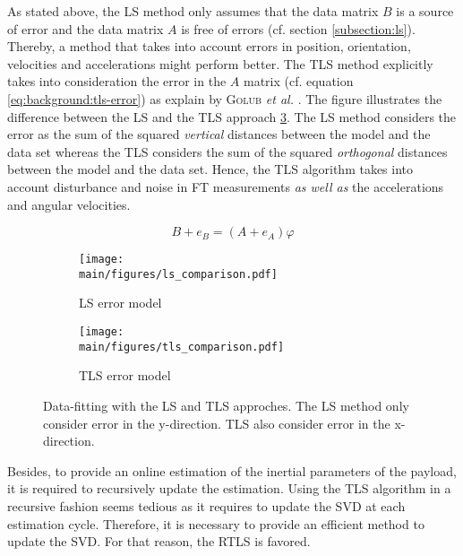 \documentclass[/home/francois/latex/report/main.tex]{subfiles}
\begin{document}
As stated above, the \ac{LS} method only assumes that the data matrix $B$ is a source of error and the data matrix $A$ is free of errors (cf. section \ref{subsection:ls}). Thereby, a method that takes into account errors in position, orientation, velocities and accelerations might perform better. The \ac{TLS} method explicitly takes into consideration the error in the $A$ matrix (cf. equation \ref{eq:background:tls-error}) as explain by \textsc{Golub} \textit{et al.} \cite{Golub1980}. The figure illustrates the difference between the \ac{LS} and the \ac{TLS} approach \ref{fig:background:ls-tls-error}. The \ac{LS} method considers the error as the sum of the squared \textit{vertical} distances between the model and the data set whereas the \ac{TLS} considers the sum of the squared \textit{orthogonal} distances between the model and the data set. Hence, the \ac{TLS} algorithm takes into account disturbance and noise in \ac{FT} measurements \textit{as well as} the accelerations and angular velocities.

\begin{equation}
  \label{eq:background:tls-error}
B + e_B = (A + e_A) \varphi
\end{equation}

\begin{figure}[h]
\centering
\begin{subfigure}{0.49\textwidth}
\centering
\texttt{[image: \\main/figures/ls\_comparison.pdf]}
\caption{\ac{LS} error model}
\label{fig:background:ls-error}
\end{subfigure}
\begin{subfigure}{0.49\textwidth}
\centering
\texttt{[image: \\main/figures/tls\_comparison.pdf]}
\caption{\ac{TLS} error model}
\label{fig:background:tls-error}
\end{subfigure}
\caption{Data-fitting with the \ac{LS} and \ac{TLS} approches. The \ac{LS} method only consider error in the y-direction. \ac{TLS} also consider error in the x-direction.}
\label{fig:background:ls-tls-error}
\end{figure}

Besides, to provide an online estimation of the inertial parameters of the payload, it is required to recursively update the estimation. Using the \ac{TLS} algorithm in a recursive fashion seems tedious as it requires to update the \ac{SVD} at each estimation cycle. Therefore, it is necessary to provide an efficient method to update the \ac{SVD}. For that reason, the \ac{RTLS} is favored.
\end{document}
